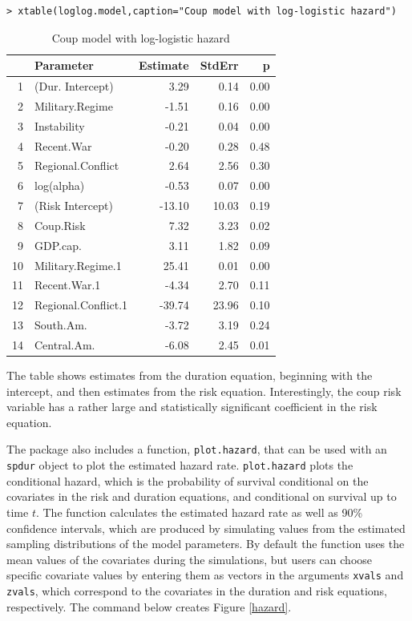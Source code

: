 \documentclass[article]{jss}
\begin{document}
\begin{verbatim}
> xtable(loglog.model,caption="Coup model with log-logistic hazard")
\end{verbatim}

\begin{table}[ht]
\centering
\caption{Coup model with log-logistic hazard} \label{loglog_table}
\begin{tabular}{rlrrr}
  \hline
 & Parameter & Estimate & StdErr & p \\ 
  \hline
1 & (Dur. Intercept) & 3.29 & 0.14 & 0.00 \\ 
  2 & Military.Regime & -1.51 & 0.16 & 0.00 \\ 
  3 & Instability & -0.21 & 0.04 & 0.00 \\ 
  4 & Recent.War & -0.20 & 0.28 & 0.48 \\ 
  5 & Regional.Conflict & 2.64 & 2.56 & 0.30 \\ 
  6 & log(alpha) & -0.53 & 0.07 & 0.00 \\ 
  7 & (Risk Intercept) & -13.10 & 10.03 & 0.19 \\ 
  8 & Coup.Risk & 7.32 & 3.23 & 0.02 \\ 
  9 & GDP.cap. & 3.11 & 1.82 & 0.09 \\ 
  10 & Military.Regime.1 & 25.41 & 0.01 & 0.00 \\ 
  11 & Recent.War.1 & -4.34 & 2.70 & 0.11 \\ 
  12 & Regional.Conflict.1 & -39.74 & 23.96 & 0.10 \\ 
  13 & South.Am. & -3.72 & 3.19 & 0.24 \\ 
  14 & Central.Am. & -6.08 & 2.45 & 0.01 \\ 
   \hline
\end{tabular}
\end{table}

\normalsize
The table shows estimates from the duration equation, beginning with the
intercept, and then estimates from the risk equation. Interestingly, the
coup risk variable has a rather large and statistically significant
coefficient in the risk equation.

The package also includes a function, \texttt{plot.hazard}, that can be
used with an \texttt{spdur} object to plot the estimated hazard rate.
\texttt{plot.hazard} plots the conditional hazard, which is the
probability of survival conditional on the covariates in the risk and
duration equations, and conditional on survival up to time \(t\). The
function calculates the estimated hazard rate as well as 90\% confidence
intervals, which are produced by simulating values from the estimated
sampling distributions of the model parameters. By default the function
uses the mean values of the covariates during the simulations, but users
can choose specific covariate values by entering them as vectors in the
arguments \texttt{xvals} and \texttt{zvals}, which correspond to the
covariates in the duration and risk equations, respectively. The command
below creates Figure \ref{hazard}.
\end{document}
